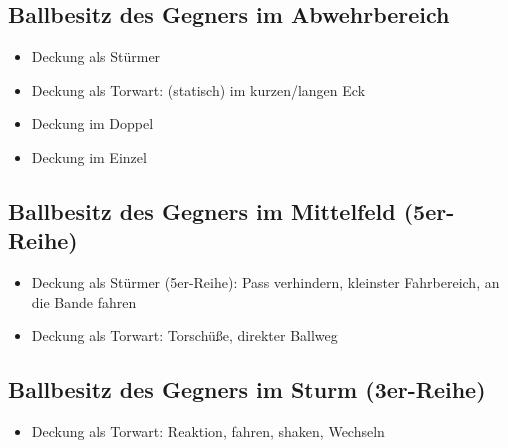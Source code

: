 \subsection{Ballbesitz des Gegners im Abwehrbereich}
\label{technik:defensive:gegnerabwehr}

\begin{itemize}
\item Deckung als Stürmer
\item Deckung als Torwart: (statisch) im kurzen/langen Eck
\item Deckung im Doppel
\item Deckung im Einzel
\end{itemize}


\subsection{Ballbesitz des Gegners im Mittelfeld (5er-Reihe)}
\label{technik:defensive:gegnermittelfeld}

\begin{itemize}
\item Deckung als Stürmer (5er-Reihe): Pass verhindern, kleinster Fahrbereich, an die Bande fahren
\item Deckung als Torwart: Torschüße, direkter Ballweg
\end{itemize}


\subsection{Ballbesitz des Gegners im Sturm (3er-Reihe)}
\label{technik:defensive:gegnersturm}

\begin{itemize}
\item Deckung als Torwart: Reaktion, fahren, shaken, Wechseln
\end{itemize}

